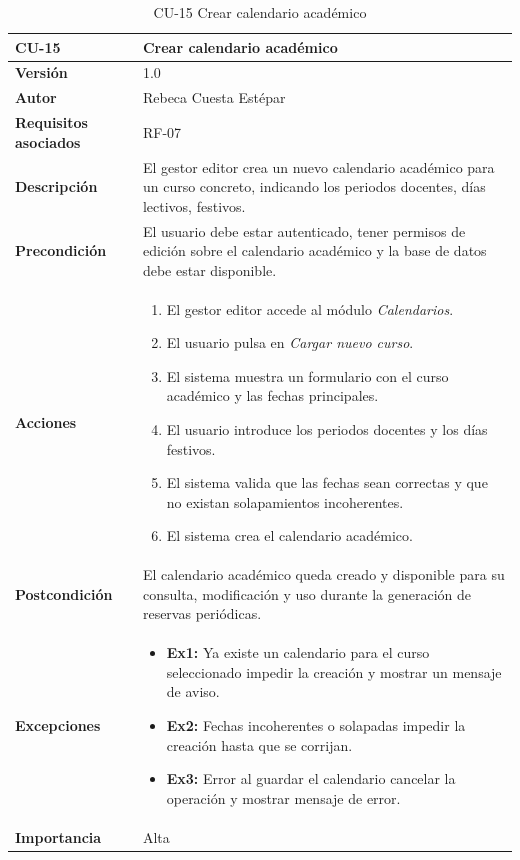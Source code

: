 \begin{table}[p]
	\centering
	\begin{tabularx}{\linewidth}{ p{} p{} }
		\toprule
		\textbf{CU-15} & \textbf{Crear calendario académico}\\
		\toprule
		\textbf{Versión} & 1.0 \\
		\textbf{Autor} & Rebeca Cuesta Estépar \\
		\textbf{Requisitos asociados} & RF-07 \\
		\textbf{Descripción} & El gestor editor crea un nuevo calendario académico para un curso concreto, indicando los periodos docentes, días lectivos, festivos.\\
		\textbf{Precondición} & El usuario debe estar autenticado, tener permisos de edición sobre el calendario académico y la base de datos debe estar disponible. \\
		\textbf{Acciones} &
		\begin{enumerate}
			\def\labelenumi{\arabic{enumi}.}
			\tightlist
			\item El gestor editor accede al módulo \emph{Calendarios}.
			\item El usuario pulsa en \emph{Cargar nuevo curso}.
			\item El sistema muestra un formulario con el curso académico y las fechas principales.
			\item El usuario introduce los periodos docentes y los días festivos.
			\item El sistema valida que las fechas sean correctas y que no existan solapamientos incoherentes.
			\item El sistema crea el calendario académico.
		\end{enumerate}\\
		\textbf{Postcondición} & El calendario académico queda creado y disponible para su consulta, modificación y uso durante la generación de reservas periódicas. \\
		\textbf{Excepciones} &
		\begin{itemize}
			\tightlist
			\item \textbf{Ex1:} Ya existe un calendario para el curso seleccionado \textrightarrow{} impedir la creación y mostrar un mensaje de aviso.
			\item \textbf{Ex2:} Fechas incoherentes o solapadas \textrightarrow{} impedir la creación hasta que se corrijan.
			\item \textbf{Ex3:} Error al guardar el calendario \textrightarrow{} cancelar la operación y mostrar mensaje de error.
		\end{itemize}\\
		\textbf{Importancia} & Alta \\
		\bottomrule
	\end{tabularx}
	\caption{CU-15 Crear calendario académico}
\end{table}


